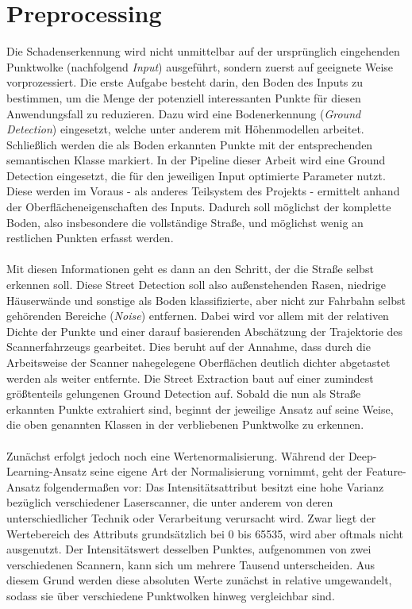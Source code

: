 \section{Preprocessing}

Die Schadenserkennung wird nicht unmittelbar auf der ursprünglich eingehenden Punktwolke (nachfolgend \textit{Input}) ausgeführt, sondern zuerst auf geeignete Weise vorprozessiert.
Die erste Aufgabe besteht darin, den Boden des Inputs zu bestimmen, um die Menge der potenziell interessanten Punkte für diesen Anwendungsfall zu reduzieren. Dazu wird eine Bodenerkennung (\textit{Ground Detection}) eingesetzt, welche unter anderem mit Höhenmodellen arbeitet. Schließlich werden die als Boden erkannten Punkte mit der entsprechenden semantischen Klasse markiert. In der Pipeline dieser Arbeit wird eine Ground Detection eingesetzt, die für den jeweiligen Input optimierte Parameter nutzt. Diese werden im Voraus - als anderes Teilsystem des Projekts - ermittelt anhand der Oberflächeneigenschaften des Inputs. Dadurch soll möglichst der komplette Boden, also insbesondere die vollständige Straße, und möglichst wenig an restlichen Punkten erfasst werden. \\\\
Mit diesen Informationen geht es dann an den Schritt, der die Straße selbst erkennen soll. Diese Street Detection soll also außenstehenden Rasen, niedrige Häuserwände und sonstige als Boden klassifizierte, aber nicht zur Fahrbahn selbst gehörenden Bereiche (\textit{Noise}) entfernen. Dabei wird vor allem mit der relativen Dichte der Punkte und einer darauf basierenden Abschätzung der Trajektorie des Scannerfahrzeugs gearbeitet. Dies beruht auf der Annahme, dass durch die Arbeitsweise der Scanner nahegelegene Oberflächen deutlich dichter abgetastet werden als weiter entfernte. Die Street Extraction baut auf einer zumindest größtenteils gelungenen Ground Detection auf. Sobald die nun als Straße erkannten Punkte extrahiert sind, beginnt der jeweilige Ansatz auf seine Weise, die oben genannten Klassen in der verbliebenen Punktwolke zu erkennen. \\\\
Zunächst erfolgt jedoch noch eine Wertenormalisierung. Während der Deep-Learning-Ansatz seine eigene Art der Normalisierung vornimmt, geht der Feature-Ansatz folgendermaßen vor: Das Intensitätsattribut besitzt eine hohe Varianz bezüglich verschiedener Laserscanner, die unter anderem von deren unterschiedlicher Technik oder Verarbeitung verursacht wird. Zwar liegt der Wertebereich des Attributs grundsätzlich bei 0 bis 65535, wird aber oftmals nicht ausgenutzt. Der Intensitätswert desselben Punktes, aufgenommen von zwei verschiedenen Scannern, kann sich um mehrere Tausend unterscheiden. Aus diesem Grund werden diese absoluten Werte zunächst in relative umgewandelt, sodass sie über verschiedene Punktwolken hinweg vergleichbar sind. \\
